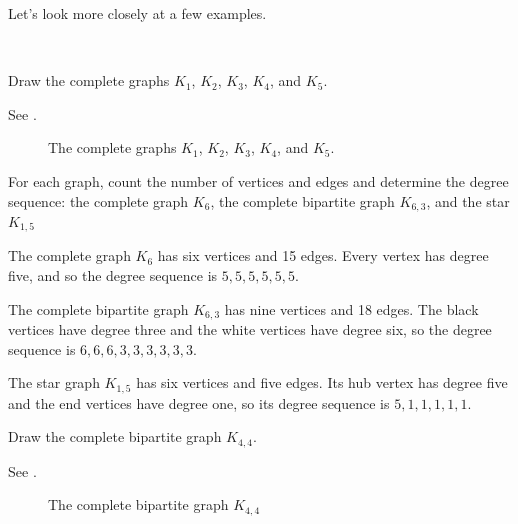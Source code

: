 Let's look more closely at a few examples.

\begin{exam}
\label{exam_complete_completebipartite_star}
~    
        \begin{apart}
            \item Draw the complete graphs $K_1$, $K_2$, $K_3$, $K_4$, and $K_5$.
                \begin{soln}
                    See .
                \end{soln}

                \begin{figure} [hbtp]
                    \centering
                    
                    \caption{The complete graphs $K_1$, $K_2$, $K_3$, $K_4$, and $K_5$.}
                    \label{fig_complete_graphs_12345}
                \end{figure}
        
            \item For each graph, count the number of vertices and edges and determine the degree sequence: the complete graph $K_6$, the complete bipartite graph $K_{6,3}$, and the star $K_{1,5}$

                \begin{soln}
                    The complete graph $K_6$ has six vertices and 15 edges. Every vertex has degree five, and so the degree sequence is $5,5,5,5,5,5$.
                    
                    The complete bipartite graph $K_{6,3}$ has nine vertices and 18 edges.  The black vertices have degree three and the white vertices have degree six, so the degree sequence is $6,6,6,3,3,3,3,3,3$.

                    The star graph $K_{1,5}$ has six vertices and five edges. Its hub vertex has degree five and the end vertices have degree one, so its degree sequence is $5,1,1,1,1,1$.
                \end{soln}

            \item Draw the complete bipartite graph $K_{4,4}$.    
                \begin{soln}
                    See .
                \end{soln}

                \begin{figure}[hbtp]
                    \centering
                    
                    \caption{The complete bipartite graph $K_{4,4}$}
                    \label{fig_K4b4}
                \end{figure}
        \end{apart}
\end{exam}

